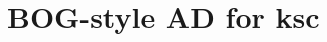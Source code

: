 \documentclass[sigplan,review]{acmart}
\renewcommand{\arraystretch}{1.5}
\newcommand{\lb}{\llbracket}
\newcommand{\rb}{\rrbracket}
\begin{document}
\section{BOG-style AD for ksc}

\newcommand{\fbog}[1]{#1_{\mathit{fbog}}}
\newcommand{\rbog}[1]{#1_{\mathit{rbog}}}
\newcommand{\gradfbog}[1]{\nabla_{\! f}\lb #1 \rb}  %
\newcommand{\gradrbog}[3]{\nabla_{\! r}\lb #1 \rb\;#2\;#3}  %
\newcommand{\bog}[1]{{\mathcal B}[e]}
\newcommand{\append}{+\!\!+}
\newcommand{\freevars}[1]{\mathit{fvs}(#1)}

\newenvironment{codearray}[1]
               {\renewcommand{\arraystretch}{1.0} \begin{array}[t]{@{}#1}}
               {\end{array}}
\end{document}
